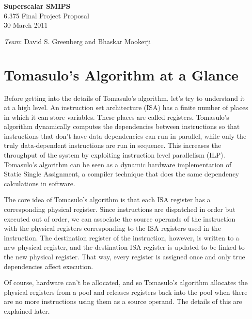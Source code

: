 \documentclass[12pt]{article}
\begin{document}
  \begin{center}
    \textbf{\large Superscalar SMIPS} \\
    6.375 Final Project Proposal\\
    30 March 2011 \\
    
    \vspace{\baselineskip}
    
    \emph{Team}: David S. Greenberg and Bhaskar Mookerji
  \end{center}




\section{Tomasulo's Algorithm at a Glance}

Before getting into the details of Tomasulo's algorithm, let's try to understand it at a high level. An instruction set architecture (ISA) has a finite number of places in which
it can store variables. These places are called registers. Tomasulo's algorithm dynamically computes the dependencies between instructions so that instructions that
don't have data dependencies can run in parallel, while only the truly data-dependent instructions are run in sequence. This increases the throughput of the system by exploiting
instruction level parallelism (ILP). Tomasulo's algorithm can be seen as a dynamic hardware implementation of Static Single Assignment, a compiler technique that does
the same dependency calculations in software.

The core idea of Tomasulo's algorithm is that each ISA register has a corresponding physical register. Since instructions are dispatched in order but executed out of order,
we can associate the source operands of the instruction with the physical registers corresponding to the ISA registers used in the instruction. The destination register of
the instruction, however, is written to a new physical register, and the destination ISA register is updated to be linked to the new physical register. That way, every 
register is assigned once and only true dependencies affect execution.

Of course, hardware can't be allocated, and so Tomasulo's algorithm allocates the physical registers from a pool and releases registers back into the pool when there are
no more instructions using them as a source operand. The details of this are explained later.
\end{document}
